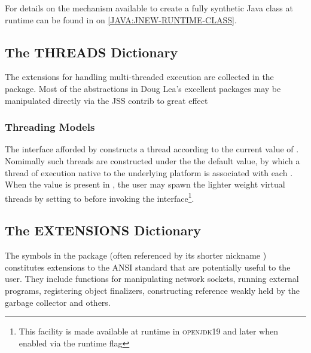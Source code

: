 \documentclass[10pt]{book}
\begin{document}
For details on the mechanism available to create a fully synthetic
Java class at runtime can be found in 
on \ref{JAVA:JNEW-RUNTIME-CLASS}.



\subsection{The THREADS Dictionary}

The extensions for handling multi-threaded execution are collected in
the  package.  Most of the abstractions in Doug Lea's
excellent  packages may be manipulated
directly via the JSS contrib to great effect \cite{lea-1998}

\subsubsection{Threading Models}
 The interface afforded by
 constructs a thread according to the
current value of .  Nomimally such
threads are constructed under the the default  value, by
which a thread of execution native to the underlying platform is
associated with each .  When the value
 is present in , the user
may spawn the lighter weight virtual threads by setting
 to  before invoking
the  interface\footnote{This facility is
made available at runtime in \textsc{openjdk19} and later when enabled
via the runtime  flag}.  



\subsection{The EXTENSIONS Dictionary}

The symbols in the  package (often referenced by its
shorter nickname ) constitutes extensions to the
\textsc{ANSI} standard that are potentially useful to the user.  They
include functions for manipulating network sockets, running external
programs, registering object finalizers, constructing reference weakly
held by the garbage collector and others.
\end{document}
